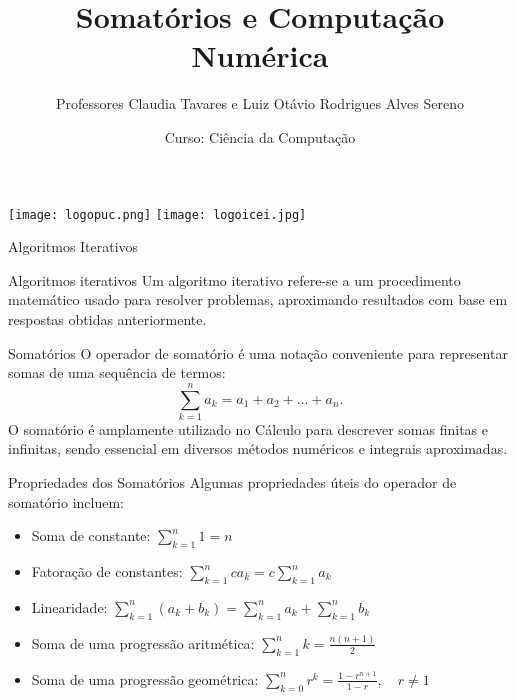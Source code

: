 \documentclass{beamer}
\title{Somatórios e Computação Numérica}
\author{Professores Claudia Tavares e Luiz Otávio Rodrigues Alves Sereno}
\date{Curso: Ciência da Computação}
\begin{document}
\begin{frame}
    \titlepage
    \vfill
    \begin{center}
    \vspace{-0.9cm}
        \texttt{[image: logopuc.png]} \hspace{1.4cm}
        \texttt{[image: logoicei.jpg]}
    \end{center}
\end{frame}

\begin{frame}{Algoritmos Iterativos}
    
   \begin{block}{Algoritmos iterativos}
Um algoritmo iterativo refere-se a um procedimento matemático usado para resolver problemas, aproximando resultados com base em respostas obtidas anteriormente. 
    \end{block} 
\end{frame}

\begin{frame}{Somatórios}
    O operador de somatório é uma notação conveniente para representar somas de uma sequência de termos:
    \[
        \sum_{k=1}^{n} a_k = a_1 + a_2 + \dots + a_n.
    \]
    O somatório é amplamente utilizado no Cálculo para descrever somas finitas e infinitas, sendo essencial em diversos métodos numéricos e integrais aproximadas.
\end{frame}

\begin{frame}{Propriedades dos Somatórios}
    Algumas propriedades úteis do operador de somatório incluem:
    \begin{itemize}
    \item Soma de constante: \( \displaystyle \sum_{k=1}^{n} 1 = n\)
        \item Fatoração de constantes: \( \displaystyle \sum_{k=1}^{n} c a_k = c \sum_{k=1}^{n} a_k \)
        \item Linearidade: \( \displaystyle \sum_{k=1}^{n} (a_k + b_k) = \sum_{k=1}^{n} a_k + \sum_{k=1}^{n} b_k \)
        \item Soma de uma progressão aritmética: \( \displaystyle \sum_{k=1}^{n} k = \frac{n(n+1)}{2} \)
        \item Soma de uma progressão geométrica: \( \displaystyle \sum_{k=0}^{n} r^k = \frac{1 - r^{n+1}}{1 - r}, \quad r \neq 1 \)
    \end{itemize}
\end{frame}
\end{document}

